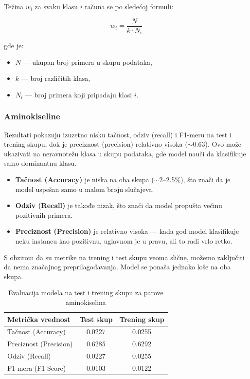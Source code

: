 \documentclass[a4paper,12pt]{article}
\begin{document}
Težina $w_i$ za svaku klasu $i$ računa se po sledećoj formuli:

\[
w_i = \frac{N}{k \cdot N_i}
\]

gde je:
\begin{itemize}
    \item $N$ --- ukupan broj primera u skupu podataka,
    \item $k$ --- broj različitih klasa,
    \item $N_i$ --- broj primera koji pripadaju klasi $i$.
\end{itemize}

\subsubsection*{Aminokiseline}

Rezultati pokazuju izuzetno nisku tačnost, odziv (recall) i F1-meru na test i trening skupu, dok je preciznost (precision) relativno visoka ($\sim$0.63). Ovo može ukazivati na neravnotežu klasa u skupu podataka, gde model nauči da klasifikuje samo dominantnu klasu.

\bigskip
\begin{itemize}
    \item \textbf{Tačnost (Accuracy)} je niska na oba skupa ($\sim$2--2.5\%), što znači da je model uspešan samo u malom broju slučajeva.
    \item \textbf{Odziv (Recall)} je takođe nizak, što znači da model propušta većinu pozitivnih primera.
    \item \textbf{Preciznost (Precision)} je relativno visoka --- kada god model klasifikuje neku instancu kao pozitivnu, uglavnom je u pravu, ali to radi vrlo retko.
\end{itemize}
S obzirom da su metrike na trening i test skupu veoma slične, možemo zaključiti da nema značajnog preprilagođavanja. Model se ponaša jednako loše na oba skupa.

\begin{table}[h!]
    \centering
    \caption{Evaluacija modela na test i trening skupu za parove aminokiselina}
    \begin{tabular}{l|cc}
    \textbf{Metrička vrednost} & \textbf{Test skup} & \textbf{Trening skup} \\
    \hline
    Tačnost (Accuracy)   & 0.0227   & 0.0255 \\
    Preciznost (Precision) & 0.6285   & 0.6292 \\
    Odziv (Recall)        & 0.0227   & 0.0255 \\
    F1 mera (F1 Score)     & 0.0103   & 0.0122 \\
    \end{tabular}
\end{table}
\end{document}
